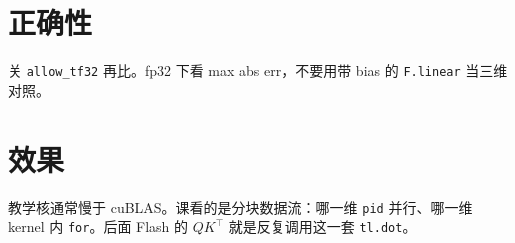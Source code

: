 \section{正确性}

\begin{note}
关 \texttt{allow\_tf32} 再比。fp32 下看 max abs err，不要用带 bias 的 \texttt{F.linear} 当三维对照。
\end{note}

\section{效果}

\begin{remark}
教学核通常慢于 cuBLAS。课看的是分块数据流：哪一维 \texttt{pid} 并行、哪一维 kernel 内 \texttt{for}。后面 Flash 的 $QK^\top$ 就是反复调用这一套 \texttt{tl.dot}。
\end{remark}
